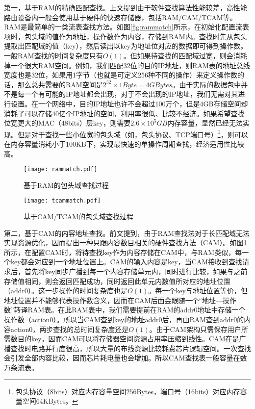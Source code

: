 第一，基于RAM的精确匹配查找。上文提到由于软件查找算法性能较差，高性能路由设备内一般会使用基于硬件的快速存储器，包括RAM/CAM/TCAM等。RAM是最简单的一类流表查找方法。如图\ref{fig:rammatch}所示，在初始化配置流表项时，包头域的值作为地址，操作数作为内容，存储到RAM内。查找时先从包头提取出匹配域的值（key），然后读出以key为地址位对应的数据即可得到操作数。一般RAM查找的时间复杂度只有$O(1)$。但如果待查找的匹配域过宽，则会消耗掉一个很大RAM空间。例如，我们匹配32位的目的IP地址，则RAM表的地址总线宽度也是32位，如果用1字节（也就是可定义256种不同的操作）来定义操作数的话，那么总共需要的RAM空间是$2^{32}\times 1Byte=4GBytes$。由于实际的数据包中并不是每一个有可能的IP地址都会出现，对于不会出现的IP地址，我们无需对其进行设置。在一个网络中，目的IP地址也许不会超过100万个，但是4GB存储空间却消耗了可以存储40亿个IP地址的空间，利用率很低、比较不经济。如果希望查找位宽更大的MAC（48bits）层key，则需要$2.6\times 10^{5}GB$内存容量，显然已经无法实现。但是对于查找一些小位宽的包头域（如，包头协议、TCP端口号）\footnote{包头协议（8bits）对应内存容量空间256Bytes，端口号（16bits）对应内存容量空间64KBytes。}，则可以在内存容量消耗小于100KB下，实现最快速的单操作周期查找，经济适用性比较高。

\begin{figure}[htbp]
	\centering
	\begin{minipage}[t]{0.39\textwidth}
		\centering
		\texttt{[image: rammatch.pdf]}
		\caption{基于RAM的包头域查找过程} \label{fig:rammatch}
	\end{minipage}
	\begin{minipage}[t]{0.6\textwidth}
		\centering
		\texttt{[image: tcammatch.pdf]}%
		\caption{基于CAM/TCAM的包头域查找过程} \label{fig:tcammatch}
	\end{minipage}
\end{figure}

第二，基于CAM的内容地址查找。前文提到，由于RAM查找法对于长匹配域无法实现资源优化，因而提出一种只跟内容数目相关的硬件查找方法（CAM）。如图\ref{fig:tcammatch}所示，在配置CAM时，将待查找key作为内容存储在CAM中，与RAM类似，每一个key都会对应到一个地址位置上。CAM的输入内容是key，当CAM接收到查找请求后，首先将key同步广播到每一个内容存储单元内，同时进行比较，如果与之前存储值相同，则会返回匹配成功，同时返回此单元内数值所对应的地址位置（addr0）。这一步操作的时间复杂度也是$O(1)$。每一个key与地址位置等价，但地址位置并不能够代表操作数含义，因而在CAM后面会跟随一个“地址---操作数”转译RAM表。在此RAM表中，我们需要提前在RAM的addr0地址中存储一个操作数（action0）。所以当CAM查到key的地址addr0后，再由RAM查到addr0的内容action0，两步查找的总时间复杂度还是$O(1)$。由于CAM架构只需保存用户所需数目的key，因而CAM可以将存储器空间资源占用率压缩到线性。CAM在是广播查找时电路并行度很高，所以大量的布线资源比较耗费芯片逻辑空间。一次查找会引发全部内容比较，因而芯片耗电量也会增加。所以CAM查找表一般容量在数万条流表。

